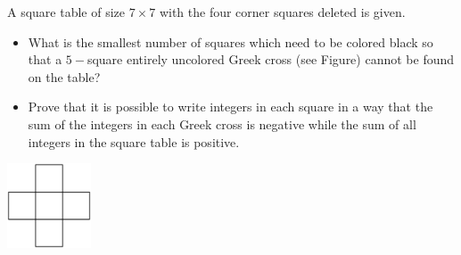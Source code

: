 A square table of size $7\times 7$ with the four corner squares deleted is given.
\begin{itemize}
	\item What is the smallest number of squares which need to be colored black so that a $5-$square entirely uncolored Greek cross (see Figure) cannot be found on the table?
	\item Prove that it is possible to write integers in each square in a way that the sum of the integers in each Greek cross is negative while the sum of all integers in the square table is positive.
\end{itemize}
\begin{center}
\includegraphics[width = 25.0mm]{img/fig0.png}
\end{center}
